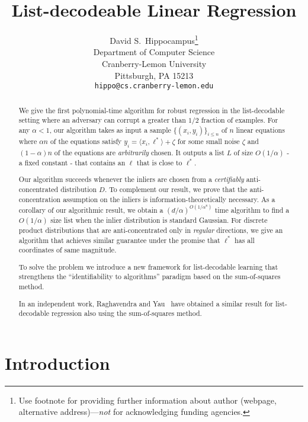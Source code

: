 \documentclass{article}
\title{List-decodeable Linear Regression}
\author{%
  David S.~Hippocampus\thanks{Use footnote for providing further information
    about author (webpage, alternative address)---\emph{not} for acknowledging
    funding agencies.} \\
  Department of Computer Science\\
  Cranberry-Lemon University\\
  Pittsburgh, PA 15213 \\
  \texttt{hippo@cs.cranberry-lemon.edu} \\
}
\theoremstyle{definition}
\theoremstyle{remark}
\numberwithin{equation}{section}
\newcommand{\1}{\bm{1}}
\begin{document}
\maketitle

\begin{abstract}
We give the first polynomial-time algorithm for robust regression in the list-decodable setting where an adversary can corrupt a greater than $1/2$ fraction of examples. %
For any $\alpha < 1$, our algorithm takes as input a sample $\{(x_i,y_i)\}_{i \leq n}$ of $n$ linear equations where $\alpha n$ of the equations satisfy $y_i = \langle x_i,\ell^*\rangle +\zeta$ for some small noise $\zeta$ and $(1-\alpha)n$ of the equations are {\em arbitrarily} chosen. It outputs a list $L$ of size $O(1/\alpha)$ - a fixed constant - that contains an $\ell$ that is close to $\ell^*$.

Our algorithm succeeds whenever the inliers are chosen from a \emph{certifiably} anti-concentrated distribution $D$. To  complement our result, we prove that the anti-concentration assumption on the inliers is information-theoretically necessary. As a corollary of our algorithmic result, we obtain a $(d/\alpha)^{O(1/\alpha^8)}$ time algorithm to find a $O(1/\alpha)$ size list when the inlier distribution is standard Gaussian. For discrete product distributions that are anti-concentrated only in \emph{regular} directions, we give an algorithm that achieves similar guarantee under the promise that $\ell^*$ has all coordinates of same magnitude.


To solve the problem we introduce a new framework for list-decodable learning that strengthens the ``identifiability to algorithms'' paradigm based on the sum-of-squares method.

In an independent work, Raghavendra and Yau~\cite{RY19} have obtained a similar result for list-decodable regression also using the sum-of-squares method.
\end{abstract}

\section{Introduction}



\end{document}
